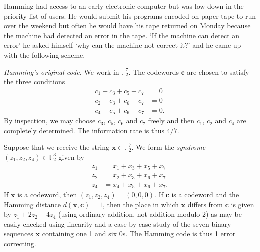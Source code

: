 \documentclass[12pt,a4paper]{article}
\theoremstyle{plain}
\theoremstyle{definition}
\begin{document}
    Hamming had access to an early electronic computer
    but was low down in the priority list of users.
    He would submit his
    programs encoded on paper tape to run over the
    weekend but often he would have his tape returned
    on Monday because the machine had detected an error
    in the tape. `If the machine can detect an error'
    he asked himself `why can the machine not correct it?'
    and he came up with the following scheme.

    \noindent\emph{Hamming's original code.}
    We work in ${\mathbb F}_{2}^{7}$. The codewords
    ${\mathbf c}$ are chosen to satisfy the
    three conditions
    \begin{align*}
        c_{1}+c_{3}+c_{5}+c_{7}&=0\\
        c_{2}+c_{3}+c_{6}+c_{7}&=0\\
        c_{4}+c_{5}+c_{6}+c_{7}&=0.
    \end{align*}
    By inspection, we may choose $c_{3}$, $c_{5}$, $c_{6}$
    and $c_{7}$ freely and then $c_{1}$, $c_{2}$ and $c_{4}$
    are completely determined. The information rate is
    thus $4/7$.

    Suppose that we receive the string
    ${\mathbf x}\in{\mathbb F}_{2}^{7}$.
    We form the \emph{syndrome}
    $(z_{1},z_{2},z_{4})\in{\mathbb F}_{2}^{3}$
    given by
    \begin{align*}
        z_{1}&=x_{1}+x_{3}+x_{5}+x_{7}\\
        z_{2}&=x_{2}+x_{3}+x_{6}+x_{7}\\
        z_{4}&=x_{4}+x_{5}+x_{6}+x_{7}.
    \end{align*}
    If ${\mathbf x}$ is a codeword, then
    $(z_{1},z_{2},z_{4})=(0,0,0)$.
    If ${\mathbf c}$ is a codeword and
    the Hamming distance $d({\mathbf x},{\mathbf c})=1$,
    then the place in which ${\mathbf x}$ differs
    from ${\mathbf c}$ is given by $z_{1}+2z_{2}+4z_{4}$
    (using ordinary addition, not addition modulo $2$)
    as may be easily checked using linearity
    and a case by case study of the seven binary
    sequences ${\mathbf x}$ containing one 1
    and six 0s. The Hamming code is thus 1
    error correcting.
\end{document}
